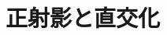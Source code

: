 \documentclass[../../topic_linear-algebra]{subfiles}
\begin{document}
\chapter{正射影と直交化}
\end{document}

